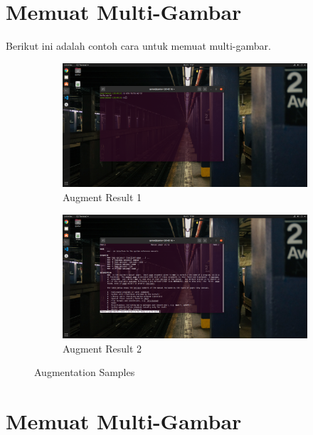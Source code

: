 \documentclass[11pt,a4paper]{article}
\begin{document}
\section{Memuat Multi-Gambar}
Berikut ini adalah contoh cara untuk memuat multi-gambar.

\begin{figure}[h]
	\centering
	\begin{subfigure}[b]{0.4\textwidth}
		\centering
		\def\svgwidth{\columnwidth}
		\includegraphics[width=1\textwidth]{figure/tut1_bagian1.png}
		\caption{Augment Result 1}
		\label{fig:aug-1}
	\end{subfigure}
	\qquad %
	\begin{subfigure}[b]{0.4\textwidth}
		\centering
		\def\svgwidth{\columnwidth}
		\includegraphics[width=1\textwidth]{figure/tut1_bagian2.png}
		\caption{Augment Result 2}
		\label{fig:aug-2}
	\end{subfigure}
	\caption{Augmentation Samples}\label{fig:aug}
\end{figure}


\newpage
\section{Memuat Multi-Gambar}
\newpage


\end{document}
